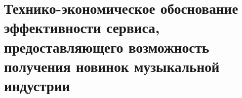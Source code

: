 \newcommand{\byr}{руб.}

\section{Технико-экономическое обоснование эффективности сервиса, предоставляющего возможность получения новинок музыкальной индустрии}













\FPeval{\salaryPerHourMjrExact}{\tariffRateFirst * \tariffFactorMjr / \workingHoursInMonth}
\FPeval{\salaryPerHourFstExact}{\tariffRateFirst * \tariffFactorFst / \workingHoursInMonth}
\FPeval{\salaryPerHourScndExact}{\tariffRateFirst * \tariffFactorScnd / \workingHoursInMonth}

